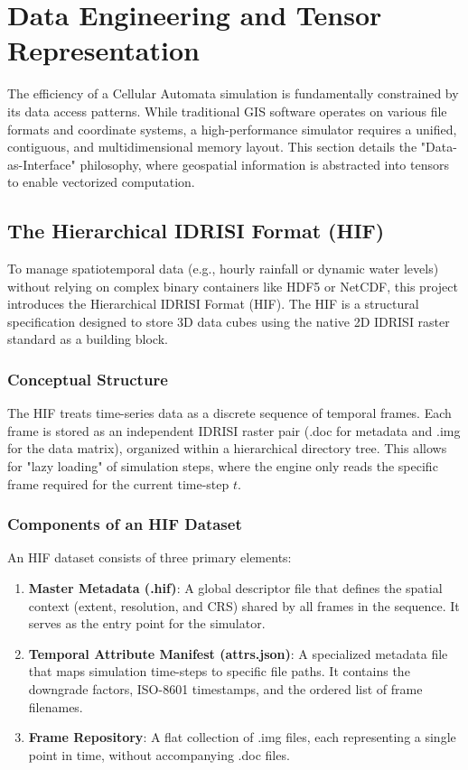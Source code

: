 \section{Data Engineering and Tensor Representation}

The efficiency of a Cellular Automata simulation is fundamentally constrained by its data access patterns. While traditional GIS 
software operates on various file formats and coordinate systems, a high-performance simulator requires a unified, contiguous, and 
multidimensional memory layout. This section details the "Data-as-Interface" philosophy, where geospatial information is abstracted 
into tensors to enable vectorized computation.


\subsection{The Hierarchical IDRISI Format (HIF)}

To manage spatiotemporal data (e.g., hourly rainfall or dynamic water levels) without relying on complex binary 
containers like HDF5 or NetCDF, this project introduces the Hierarchical IDRISI Format (HIF). The HIF is a structural 
specification designed to store 3D data cubes using the native 2D IDRISI raster standard as a building block.

\subsubsection{Conceptual Structure}

The HIF treats time-series data as a discrete sequence of temporal frames. Each frame is stored as an independent 
IDRISI raster pair (.doc for metadata and .img for the data matrix), organized within a hierarchical directory tree. 
This allows for "lazy loading" of simulation steps, where the engine only reads the specific frame required for the 
current time-step $t$.

\subsubsection{Components of an HIF Dataset}

An HIF dataset consists of three primary elements:

\begin{enumerate}
    \item \textbf{Master Metadata (.hif)}: A global descriptor file that defines the spatial context (extent, resolution, 
    and CRS) shared by all frames in the sequence. It serves as the entry point for the simulator.
    \item \textbf{Temporal Attribute Manifest (attrs.json)}: A specialized metadata file that maps simulation time-steps 
    to specific file paths. It contains the downgrade factors, ISO-8601 timestamps, and the ordered list of frame filenames.
    \item \textbf{Frame Repository}: A flat collection of .img files, each representing a single point in time, without 
    accompanying .doc files.
\end{enumerate}

